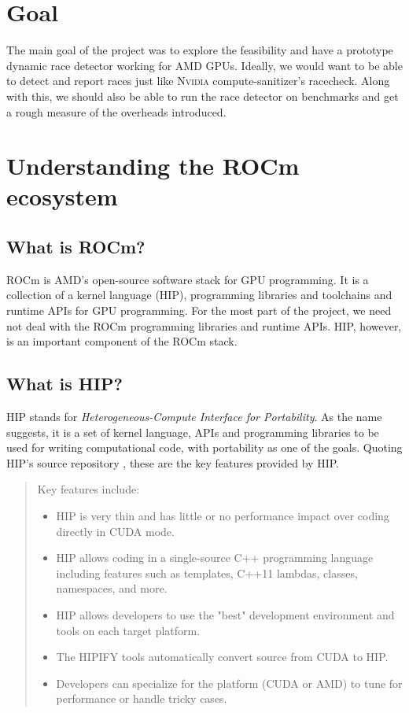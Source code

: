 \documentclass{btp}
\begin{document}
\section{Goal}

The main goal of the project was to explore the feasibility and have a prototype dynamic race detector working for AMD GPUs. Ideally, we would want to be able to detect and report races just like \textsc{Nvidia} compute-sanitizer's racecheck. Along with this, we should also be able to run the race detector on benchmarks and get a rough measure of the overheads introduced.

\section{Understanding the ROCm ecosystem}

\subsection{What is ROCm?}

ROCm \cite{rocm} is AMD's open-source software stack for GPU programming. It is a collection of a kernel language (HIP), programming libraries and toolchains and runtime APIs for GPU programming. For the most part of the project, we need not deal with the ROCm programming libraries and runtime APIs. HIP, however, is an important component of the ROCm stack.

\subsection{What is HIP?}

HIP stands for \textit{Heterogeneous-Compute Interface for Portability}. As the name suggests, it is a set of kernel language, APIs and programming libraries to be used for writing computational code, with portability as one of the goals. Quoting HIP's source repository \cite{hip-github}, these are the key features provided by HIP.

\begin{quote}
	\begin{changebar}\color{black}
		Key features include:

		\begin{itemize}
			\item HIP is very thin and has little or no performance impact over coding directly in CUDA mode.
			\item HIP allows coding in a single-source C++ programming language including features such as templates, C++11 lambdas, classes, namespaces, and more.
			\item HIP allows developers to use the "best" development environment and tools on each target platform.
			\item The HIPIFY tools automatically convert source from CUDA to HIP.
			\item Developers can specialize for the platform (CUDA or AMD) to tune for performance or handle tricky cases.
		\end{itemize}
	\end{changebar}
\end{quote}
\end{document}

